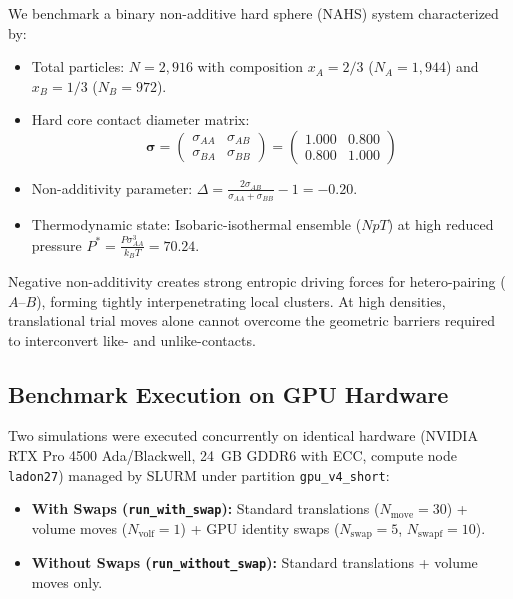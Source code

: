 \documentclass[11pt,a4paper]{article}
\begin{document}
We benchmark a binary non-additive hard sphere (NAHS) system characterized by:
\begin{itemize}
    \item Total particles: $N = 2,916$ with composition $x_A = 2/3$ ($N_A = 1,944$) and $x_B = 1/3$ ($N_B = 972$).
    \item Hard core contact diameter matrix:
    \begin{equation}
        \boldsymbol{\sigma} = \begin{pmatrix} \sigma_{AA} & \sigma_{AB} \\ \sigma_{BA} & \sigma_{BB} \end{pmatrix} = \begin{pmatrix} 1.000 & 0.800 \\ 0.800 & 1.000 \end{pmatrix}
    \end{equation}
    \item Non-additivity parameter: $\Delta = \frac{2\sigma_{AB}}{\sigma_{AA} + \sigma_{BB}} - 1 = -0.20$.
    \item Thermodynamic state: Isobaric-isothermal ensemble ($NpT$) at high reduced pressure $P^* = \frac{P \sigma_{AA}^3}{k_B T} = 70.24$.
\end{itemize}
Negative non-additivity creates strong entropic driving forces for hetero-pairing ($A\text{--}B$), forming tightly interpenetrating local clusters. At high densities, translational trial moves alone cannot overcome the geometric barriers required to interconvert like- and unlike-contacts.

\subsection{Benchmark Execution on GPU Hardware}

Two simulations were executed concurrently on identical hardware (NVIDIA RTX Pro 4500 Ada/Blackwell, 24~GB GDDR6 with ECC, compute node \texttt{ladon27}) managed by SLURM under partition \texttt{gpu\_v4\_short}:
\begin{itemize}
    \item \textbf{With Swaps (\texttt{run\_with\_swap}):} Standard translations ($N_{\text{move}} = 30$) + volume moves ($N_{\text{volf}} = 1$) + GPU identity swaps ($N_{\text{swap}} = 5$, $N_{\text{swapf}} = 10$).
    \item \textbf{Without Swaps (\texttt{run\_without\_swap}):} Standard translations + volume moves only.
\end{itemize}
\end{document}
